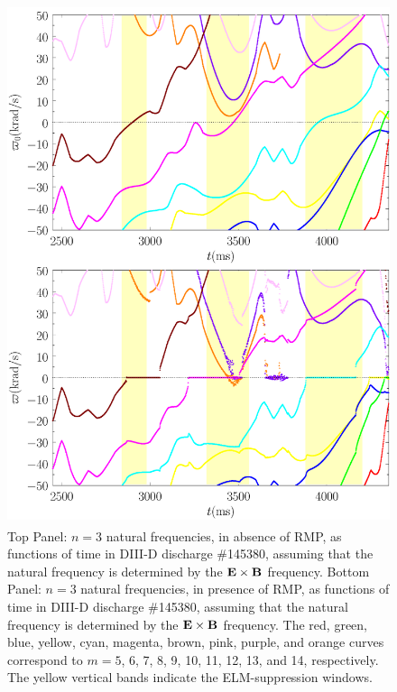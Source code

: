 \documentclass[12pt,prb,aps]{revtex4-1}
\begin{document}
\begin{figure}
\includegraphics[height=6in]{fig8.pdf}
\caption{Top Panel: $n=3$ natural frequencies, in absence of RMP, as functions of time
in   DIII-D discharge \#145380, assuming that the natural frequency is determined by the ${\bf E}\times {\bf B}$
frequency.
Bottom Panel:  $n=3$ natural frequencies, in presence of RMP, as functions of time
in   DIII-D discharge \#145380, assuming that the natural frequency is  determined by the ${\bf E}\times {\bf B}$
frequency. The red, green, blue, yellow, cyan, magenta, brown, pink,
purple, and orange  curves correspond to $m=5$, 6, 7, 8, 9, 10, 11, 12, 13, and 14, respectively. The yellow vertical bands indicate the ELM-suppression windows.} \label{fig8}
\end{figure}
\end{document}
